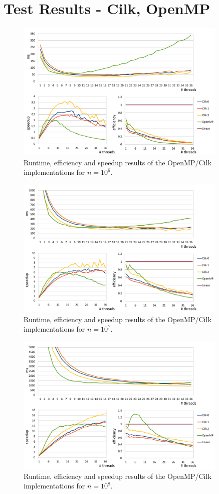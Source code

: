 \documentclass[12pt,a4paper]{article}
\begin{document}
\section{Test Results - Cilk, OpenMP}
\begin{figure}[h]
	\includegraphics[width=0.9\textwidth]{img/omp_cilk_1mil.pdf}
	\caption{Runtime, efficiency and speedup results of the OpenMP/Cilk implementations for $n=10^{6}$.}
\end{figure}
\begin{figure}[h]
	\includegraphics[width=0.9\textwidth]{img/omp_cilk_10mil.pdf}
	\caption{Runtime, efficiency and speedup results of the OpenMP/Cilk implementations for $n=10^{7}$.}
\end{figure}
\begin{figure}[h]
	\includegraphics[width=0.9\textwidth]{img/omp_cilk_100mil.pdf}
	\caption{Runtime, efficiency and speedup results of the OpenMP/Cilk implementations for $n=10^{8}$.}
\end{figure}
\end{document}
